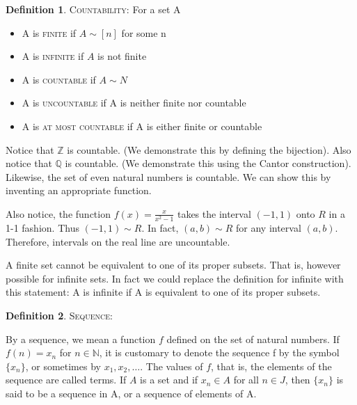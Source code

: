\documentclass{tufte-book}
\theoremstyle{definition}
\newtheorem{definition}{Definition}[chapter]
\numberwithin{section}{chapter}
\begin{document}
\begin{definition}\textsc{Countability:}  For a set A
\begin{itemize}
	\item A is \textsc{finite} if $A\sim [n]$ for some n 
	\item A is \textsc{infinite} if $A$ is not finite
	\item A is \textsc{countable} if $A \sim N$
	\item A is \textsc{uncountable} if A is neither finite nor countable
	\item A is \textsc{at most countable} if A is either finite or countable
	
\end{itemize}\end{definition}

Notice that $\mathbb{Z}$ is countable.  (We demonstrate this by defining the bijection). 
Also notice that $\mathbb{Q}$ is countable. (We demonstrate this using the Cantor construction).  Likewise, the set of even natural numbers is countable.  We can show this by inventing an appropriate function.


Also notice,  the function $f(x) = \frac{x}{x^2 - 1}$ takes the interval $(-1,1)$ onto $R$ in a 1-1 fashion.   Thus $(-1,1) \sim R$.   In fact, $(a,b) \sim R$ for any interval $(a,b)$.      Therefore, intervals on the real line are uncountable.



A finite set cannot be equivalent to one of its proper subsets.   That is, however possible for infinite sets.  In fact we could replace the definition for infinite with this statement:  A is infinite if A is equivalent to one of its proper subsets.
\bigskip


\noindent \begin{definition}\textsc{Sequence:}  \end{definition}By a sequence, we mean a function $f$ defined on the set of natural numbers.   If $f(n) = x_{n}$ for $n \in \mathbb{N}$, it is customary to denote the sequence f by the symbol $\{x_{n}\}$, or sometimes by $x_{1}, x_{2}, \ldots$. The values of $f$, that is, the elements of the sequence are called terms.  If $A$ is a set and if $x_{n} \in A$ for all $n \in J$, then $\{x_{n}\}$ is said to be a sequence in A, or a sequence of elements of A.\\
\end{document}

